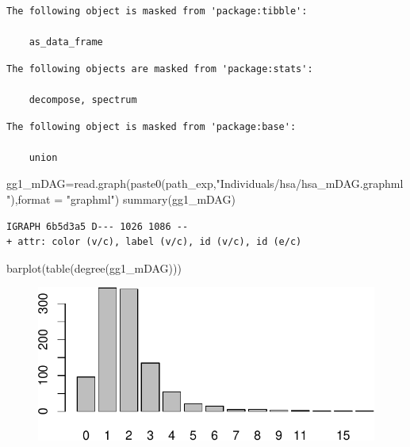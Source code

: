 \documentclass[
  letterpaper,
  DIV=11,
  numbers=noendperiod]{scrreprt}
\newenvironment{Shaded}{\begin{snugshade}}{\end{snugshade}}
\newcommand{\AttributeTok}[1]{\textcolor[rgb]{0.40,0.45,0.13}{#1}}
\newcommand{\FunctionTok}[1]{\textcolor[rgb]{0.28,0.35,0.67}{#1}}
\newcommand{\NormalTok}[1]{\textcolor[rgb]{0.00,0.23,0.31}{#1}}
\newcommand{\OtherTok}[1]{\textcolor[rgb]{0.00,0.23,0.31}{#1}}
\newcommand{\StringTok}[1]{\textcolor[rgb]{0.13,0.47,0.30}{#1}}
\begin{document}
\begin{verbatim}
The following object is masked from 'package:tibble':

    as_data_frame
\end{verbatim}

\begin{verbatim}
The following objects are masked from 'package:stats':

    decompose, spectrum
\end{verbatim}

\begin{verbatim}
The following object is masked from 'package:base':

    union
\end{verbatim}

\begin{Shaded}
\begin{Highlighting}[]
\NormalTok{gg1\_mDAG}\OtherTok{=}\FunctionTok{read.graph}\NormalTok{(}\FunctionTok{paste0}\NormalTok{(path\_exp,}\StringTok{"Individuals/hsa/hsa\_mDAG.graphml"}\NormalTok{),}\AttributeTok{format =} \StringTok{"graphml"}\NormalTok{)}
\FunctionTok{summary}\NormalTok{(gg1\_mDAG)}
\end{Highlighting}
\end{Shaded}

\begin{verbatim}
IGRAPH 6b5d3a5 D--- 1026 1086 -- 
+ attr: color (v/c), label (v/c), id (v/c), id (e/c)
\end{verbatim}

\begin{Shaded}
\begin{Highlighting}[]
\FunctionTok{barplot}\NormalTok{(}\FunctionTok{table}\NormalTok{(}\FunctionTok{degree}\NormalTok{(gg1\_mDAG)))}
\end{Highlighting}
\end{Shaded}

\begin{figure}[H]

{\centering \includegraphics{./data_load_files/figure-pdf/unnamed-chunk-12-1.pdf}

}

\end{figure}
\end{document}
